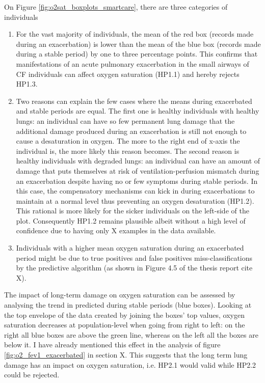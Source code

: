 On Figure \ref{fig:o2sat_boxplots_smartcare}, there are three categories of individuals
\begin{enumerate}
    \item For the vast majority of individuals, the mean of the red box (records made during an exacerbation) is lower than the mean of the blue box (records made during a stable period) by one to three percentage points. This confirms that manifestations of an acute pulmonary exacerbation in the small airways of CF individuals can affect oxygen saturation (HP1.1) and hereby rejects HP1.3.
    \item Two reasons can explain the few cases where the means during exacerbated and stable periods are equal. The first one is healthy individuals with healthy lungs: an individual can have so few permanent lung damage that the additional damage produced during an exacerbation is still not enough to cause a desaturation in oxygen. The more to the right end of x-axis the individual is, the more likely this reason becomes. The second reason is healthy individuals with degraded lungs: an individual can have an amount of damage that puts themselves at risk of ventilation-perfusion mismatch during an exacerbation despite having no or few symptoms during stable periods. In this case, the compensatory mechanisms can kick in during exacerbations to maintain \PA at a normal level thus preventing an oxygen desaturation (HP1.2). This rational is more likely for the sicker individuals on the left-side of the plot. Consequently HP1.2 remains plausible albeit without a high level of confidence due to having only X examples in the data available.
    \item Individuals with a higher mean oxygen saturation during an exacerbated period might be due to true positives and false positives miss-classifications by the predictive algorithm (as shown in Figure 4.5 of the thesis report cite X).
\end{enumerate}

The impact of long-term damage on oxygen saturation can be assessed by analysing the trend in predicted \SP during stable periods (blue boxes). Looking at the top envelope of the data created by joining the boxes' top values, oxygen saturation decreases at population-level when going from right to left: on the right all blue boxes are above the green line, whereas on the left all the boxes are below it. I have already mentioned this effect in the analysis of figure \ref{fig:o2_fev1_exacerbated} in section X. This suggests that the long term lung damage has an impact on oxygen saturation, i.e.  HP2.1 would valid while HP2.2 could be rejected.


